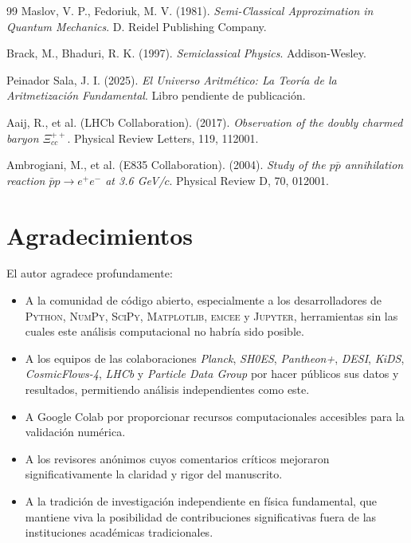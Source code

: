 \documentclass[11pt, a4paper]{article}
\theoremstyle{plain}
\theoremstyle{definition}
\begin{document}
\begin{thebibliography}{99}
Maslov, V. P., Fedoriuk, M. V. (1981). \textit{Semi-Classical Approximation in Quantum Mechanics}. D. Reidel Publishing Company.

Brack, M., Bhaduri, R. K. (1997). \textit{Semiclassical Physics}. Addison-Wesley.

Peinador Sala, J. I. (2025). \textit{El Universo Aritmético: La Teoría de la Aritmetización Fundamental}. Libro pendiente de publicación.


Aaij, R., et al. (LHCb Collaboration). (2017). \textit{Observation of the doubly charmed baryon $\Xi_{cc}^{++}$}. Physical Review Letters, 119, 112001.

Ambrogiani, M., et al. (E835 Collaboration). (2004). \textit{Study of the $p\bar{p}$ annihilation reaction $\bar{p}p \to e^+e^-$ at 3.6 GeV/$c$}. Physical Review D, 70, 012001.

\end{thebibliography}


\section*{Agradecimientos}

El autor agradece profundamente:

\begin{itemize}
    \item A la comunidad de código abierto, especialmente a los desarrolladores de \textsc{Python}, \textsc{NumPy}, \textsc{SciPy}, \textsc{Matplotlib}, \textsc{emcee} y \textsc{Jupyter}, herramientas sin las cuales este análisis computacional no habría sido posible.
    
    \item A los equipos de las colaboraciones \textit{Planck}, \textit{SH0ES}, \textit{Pantheon+}, \textit{DESI}, \textit{KiDS}, \textit{CosmicFlows-4}, \textit{LHCb} y \textit{Particle Data Group} por hacer públicos sus datos y resultados, permitiendo análisis independientes como este.
    
    \item A Google Colab por proporcionar recursos computacionales accesibles para la validación numérica.
    
    \item A los revisores anónimos cuyos comentarios críticos mejoraron significativamente la claridad y rigor del manuscrito.
    
    \item A la tradición de investigación independiente en física fundamental, que mantiene viva la posibilidad de contribuciones significativas fuera de las instituciones académicas tradicionales.
\end{itemize}
\end{document}

